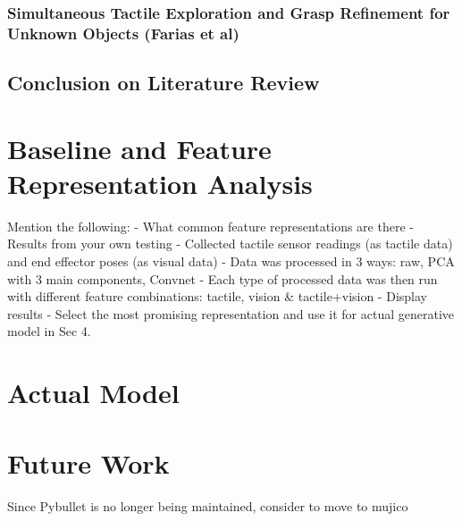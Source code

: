 \documentclass[a4paper]{report}
\theoremstyle{definition}
\begin{document}
\subsection{Simultaneous Tactile Exploration and Grasp Refinement for Unknown Objects (Farias et al)\cite{farias}}
\label{}
\section{Conclusion on Literature Review}


\chapter{Baseline and Feature Representation Analysis}
\label{chap:3}
Mention the following:
- What common feature representations are there
- Results from your own testing
    - Collected tactile sensor readings (as tactile data) and end effector poses (as visual data)
    - Data was processed in 3 ways: raw, PCA with 3 main components, Convnet
    - Each type of processed data was then run with different feature combinations: tactile, vision \& tactile+vision
    - Display results
- Select the most promising representation and use it for actual generative model in Sec 4.


\chapter{Actual Model}
\label{chap:4}


\chapter{Future Work}
\label{chap:5}
Since Pybullet is no longer being maintained, consider to move to mujico
\end{document}
